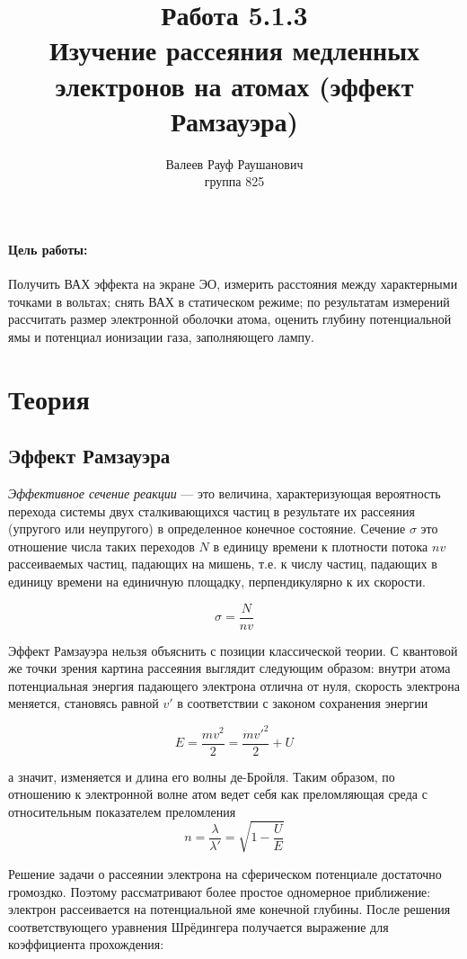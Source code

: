 \documentclass[a4paper, 12pt]{article}%
\author{Валеев Рауф Раушанович\\
группа 825}
\date{}
\title{\textbf{Работа 5.1.3\\Изучение рассеяния медленных электронов на атомах (эффект Рамзауэра)}}
\begin{document}
\maketitle
\newpage
\paragraph*{Цель работы: } Получить ВАХ эффекта на экране ЭО, измерить расстояния между характерными точками в вольтах; снять ВАХ в статическом режиме; по результатам измерений рассчитать размер электронной оболочки атома, оценить глубину потенциальной ямы и потенциал ионизации газа, заполняющего лампу.
\section*{Теория}
\subsection*{Эффект Рамзауэра}
\textit{Эффективное сечение реакции} --- это величина, характеризующая вероятность перехода системы двух сталкивающихся частиц в результате их рассеяния (упругого или неупругого) в определенное конечное состояние. Сечение $\sigma$ это отношение числа таких переходов $N$ в единицу времени к плотности потока $nv$ рассеиваемых частиц, падающих на мишень, т.е. к числу частиц, падающих в единицу времени на единичную площадку, перпендикулярно к их скорости.

\begin{equation}
\sigma = \frac{N}{nv}
\end{equation}

Эффект Рамзауэра нельзя объяснить с позиции классической теории. С квантовой же точки зрения картина рассеяния выглядит следующим образом: внутри атома потенциальная энергия падающего электрона отлична от нуля, скорость электрона меняется, становясь равной $v'$ в соответствии с законом сохранения энергии 

\[E = \frac{mv^2}{2} = \frac{mv'^2}{2}+U\]

а значит, изменяется и длина его волны де-Бройля. Таким образом, по отношению к электронной волне атом ведет себя как преломляющая среда с относительным показателем преломления
\begin{equation}
n = \frac{\lambda}{\lambda'} = \sqrt{1 - \frac{U}{E}}
\end{equation}

Решение задачи о рассеянии электрона на сферическом потенциале достаточно громоздко. Поэтому рассматривают более простое одномерное приближение: электрон рассеивается на потенциальной яме конечной глубины. После решения соответствующего уравнения Шрёдингера получается выражение для коэффициента прохождения:
\end{document}

